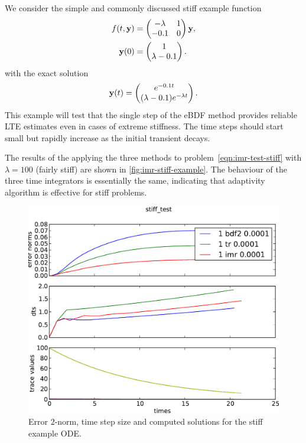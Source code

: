 We consider the simple and commonly discussed stiff example function \cite{??ds where did I get this from?}
\begin{equation}
  \label{eqn:imr-test-stiff}
  \begin{aligned}
    f(t, \mathbf{y}) &= \begin{pmatrix}
     -\lambda & 1 \\
      -0.1 & 0 \\
    \end{pmatrix}   \mathbf{y}, \\
    \mathbf{y}(0) &= \begin{pmatrix} 1  \\ \lambda - 0.1  \\ \end{pmatrix}.
  \end{aligned}
\end{equation}
with the exact solution
\begin{equation}
  \label{eqn:imr-test-stiff-exact}
  \mathbf{y}(t) = 
   \begin{pmatrix} e^{-0.1t} \\ (\lambda - 0.1)e^{-\lambda t} \end{pmatrix}.
\end{equation} 
This example will test that the single step of the eBDF method provides reliable LTE estimates even in cases of extreme stiffness.
The time steps should start small but rapidly increase as the initial transient decays.

The results of the applying the three methods to problem~\eqref{eqn:imr-test-stiff} with $\lambda = 100$ (fairly stiff) are shown in \autoref{fig:imr-stiff-example}.
The behaviour of the three time integrators is essentially the same, indicating that adaptivity algorithm is effective for stiff problems.

\begin{figure}[h!]
  \centering
  \includegraphics[width=1\textwidth]{aimr/stiff_test-errornormsvs-dtsvs-tracevaluesvstimes}
  \caption{Error $2$-norm, time step size and computed solutions for the stiff example ODE.}
  \label{fig:imr-stiff-example}
\end{figure}

